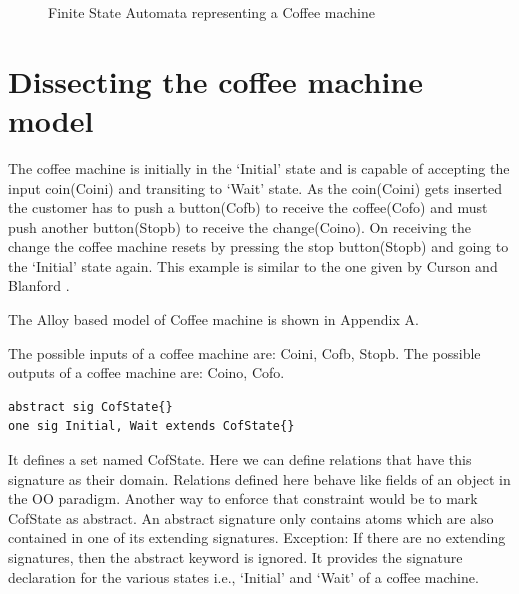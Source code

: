 \documentclass[a4paper,12pt]{report}
\begin{document}
\begin{onehalfspacing}
\begin{figure}[ht!]
 \caption{Finite State Automata representing a Coffee machine}
\end{figure}
\section{Dissecting the coffee machine model}
\label{dissecting coffee machine}
 The coffee machine is initially in the `Initial' state and is capable of accepting the input coin(Coini) and transiting to `Wait' state. As the coin(Coini) gets inserted the customer has to push a button(Cofb) to receive the coffee(Cofo) and must push another button(Stopb) to receive the change(Coino). On receiving the change the coffee machine resets by pressing the stop button(Stopb) and going to the `Initial' state again. This example is similar to the one given by Curson and Blanford \cite{A.Blandford2000}.
 
 The Alloy based model of Coffee machine is shown in Appendix A.
 
The possible inputs of a coffee machine are: Coini, Cofb, Stopb. The possible outputs of a coffee machine are: Coino, Cofo.

\begin{verbatim}
abstract sig CofState{}
one sig Initial, Wait extends CofState{}
\end{verbatim}

It defines a set named CofState. Here we can define relations that have this signature as their domain. Relations defined here behave like fields of an object in the OO paradigm. Another way to enforce that constraint would be to mark CofState as abstract. An abstract signature only contains atoms which are also contained in one of its extending signatures. Exception: If there are no extending signatures, then the abstract keyword is ignored. It provides the signature declaration for the various states i.e., `Initial' and `Wait' of a coffee machine. 


\end{onehalfspacing}
\end{document}
